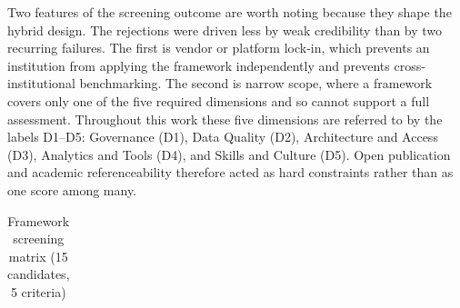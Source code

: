 Two features of the screening outcome are worth noting because they shape the hybrid design. The rejections were driven less by weak credibility than by two recurring failures. The first is vendor or platform lock-in, which prevents an institution from applying the framework independently and prevents cross-institutional benchmarking. The second is narrow scope, where a framework covers only one of the five required dimensions and so cannot support a full assessment. Throughout this work these five dimensions are referred to by the labels D1--D5: Governance (D1), Data Quality (D2), Architecture and Access (D3), Analytics and Tools (D4), and Skills and Culture (D5). Open publication and academic referenceability therefore acted as hard constraints rather than as one score among many.

\begin{center}
{\footnotesize
\setlength{\tabcolsep}{4pt}
\begin{longtable}{|p{2.6cm}|c|c|c|c|c|c|p{5.8cm}|}
\caption{Framework screening matrix (15 candidates, 5 criteria)}\label{tab:framework-screening}\\


\end{longtable}}
\end{center}
